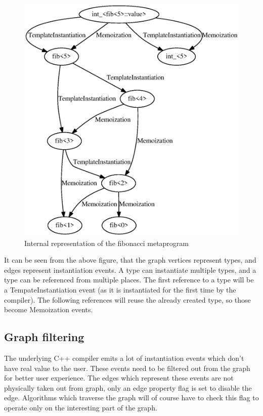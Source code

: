 \begin{figure}[H]
    \includegraphics[width=\textwidth]{img/fib5_call_graph.eps}
    \caption{Internal representation of the fibonacci metaprogram}
\end{figure}

\noindent
It can be seen from the above figure, that the graph vertices represent types,
and edges represent instantiation events. A type can instantiate multiple
types, and a type can be referenced from multiple places. The first reference
to a type will be a TempateInstantiation event (as it is instantiated for the
first time by the compiler). The following references will reuse the already
created type, so those become Memoization events.

\subsection{Graph filtering} \label{graph-filtering}

The underlying C++ compiler emits a lot of instantiation events which don't
have real value to the user. These events need to be filtered out from the
graph for better user experience. The edges which represent these events are
not physically taken out from graph, only an edge property flag is set to
disable the edge. Algorithms which traverse the graph will of course have to
check this flag to operate only on the interesting part of the graph.

